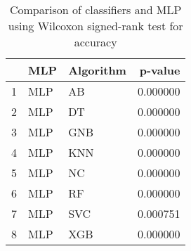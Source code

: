 \begin{table}
\footnotesize
\caption{Comparison of classifiers and MLP using Wilcoxon signed-rank test for accuracy}
\label{tab:MLP wilcoxon ACC comparison}
\begin{tabular}{lllr}
\hline
 & MLP & Algorithm & p-value \\
\hline
1 & MLP & AB & 0.000000 \\
2 & MLP & DT & 0.000000 \\
3 & MLP & GNB & 0.000000 \\
4 & MLP & KNN & 0.000000 \\
5 & MLP & NC & 0.000000 \\
6 & MLP & RF & 0.000000 \\
7 & MLP & SVC & 0.000751 \\
8 & MLP & XGB & 0.000000 \\
\hline
\end{tabular}
\end{table}
